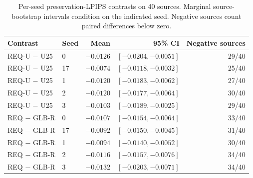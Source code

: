 \begin{table}[!t]
\centering\small
\caption{Per-seed preservation-LPIPS contrasts on 40 sources. Marginal source-bootstrap intervals condition on the indicated seed. Negative sources count paired differences below zero.}
\label{tab:r91-seeds}
\begin{tabular}{llrrr}
\toprule
Contrast & Seed & Mean & 95\% CI & Negative sources\\
\midrule
REQ-U $-$ U25 & 0 & $-0.0126$ & $[-0.0204, -0.0051]$ & 29/40\\
REQ-U $-$ U25 & 17 & $-0.0074$ & $[-0.0118, -0.0032]$ & 25/40\\
REQ-U $-$ U25 & 1 & $-0.0120$ & $[-0.0183, -0.0062]$ & 27/40\\
REQ-U $-$ U25 & 2 & $-0.0120$ & $[-0.0177, -0.0064]$ & 30/40\\
REQ-U $-$ U25 & 3 & $-0.0103$ & $[-0.0189, -0.0025]$ & 29/40\\
REQ $-$ GLB-R & 0 & $-0.0107$ & $[-0.0154, -0.0064]$ & 33/40\\
REQ $-$ GLB-R & 17 & $-0.0092$ & $[-0.0150, -0.0045]$ & 31/40\\
REQ $-$ GLB-R & 1 & $-0.0094$ & $[-0.0140, -0.0052]$ & 30/40\\
REQ $-$ GLB-R & 2 & $-0.0116$ & $[-0.0157, -0.0076]$ & 34/40\\
REQ $-$ GLB-R & 3 & $-0.0132$ & $[-0.0203, -0.0071]$ & 34/40\\
\bottomrule
\end{tabular}
\end{table}
